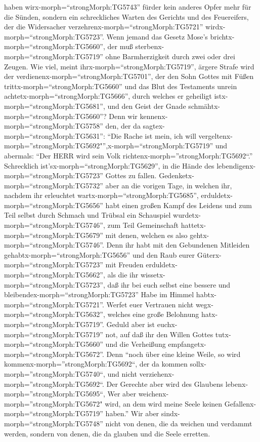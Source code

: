 haben wirx-morph=``strongMorph:TG5743'' fürder kein anderes Opfer mehr
für die Sünden,  sondern ein schreckliches Warten des
Gerichts und des Feuereifers, der die Widersacher
verzehrenx-morph=``strongMorph:TG5721''
wirdx-morph=``strongMorph:TG5723''.  Wenn jemand das Gesetz
Mose's brichtx-morph=``strongMorph:TG5660'', der muß
sterbenx-morph=``strongMorph:TG5719'' ohne Barmherzigkeit durch zwei
oder drei Zeugen.  Wie viel, meint
ihrx-morph=``strongMorph:TG5719'', ärgere Strafe wird der
verdienenx-morph=``strongMorph:TG5701'', der den Sohn Gottes mit Füßen
trittx-morph=``strongMorph:TG5660'' und das Blut des Testaments unrein
achtetx-morph=``strongMorph:TG5666'', durch welches er geheiligt
istx-morph=``strongMorph:TG5681'', und den Geist der Gnade
schmähtx-morph=``strongMorph:TG5660''?  Denn wir
kennenx-morph=``strongMorph:TG5758'' den, der da
sagtex-morph=``strongMorph:TG5631'': ``Die Rache ist mein, ich will
vergeltenx-morph=''strongMorph:TG5692"'',x-morph=``strongMorph:TG5719''
und abermals: ``Der HERR wird sein Volk
richtenx-morph=''strongMorph:TG5692``.''  Schrecklich
ist'sx-morph=``strongMorph:TG5629'', in die Hände des
lebendigenx-morph=``strongMorph:TG5723'' Gottes zu fallen. 
Gedenketx-morph=``strongMorph:TG5732'' aber an die vorigen Tage, in
welchen ihr, nachdem ihr erleuchtet wartx-morph=``strongMorph:TG5685'',
erduldetx-morph=``strongMorph:TG5656'' habt einen großen Kampf des
Leidens  und zum Teil selbst durch Schmach und Trübsal ein
Schauspiel wurdetx-morph=``strongMorph:TG5746'', zum Teil Gemeinschaft
hattetx-morph=``strongMorph:TG5679'' mit denen, welchen es also
gehtx-morph=``strongMorph:TG5746''.  Denn ihr habt mit den
Gebundenen Mitleiden gehabtx-morph=``strongMorph:TG5656'' und den Raub
eurer Güterx-morph=``strongMorph:TG5723'' mit Freuden
erduldetx-morph=``strongMorph:TG5662'', als die ihr
wissetx-morph=``strongMorph:TG5723'', daß ihr bei euch selbst eine
bessere und bleibendex-morph=``strongMorph:TG5723'' Habe im Himmel
habtx-morph=``strongMorph:TG5721''.  Werfet euer Vertrauen
nicht wegx-morph=``strongMorph:TG5632'', welches eine große Belohnung
hatx-morph=``strongMorph:TG5719''.  Geduld aber ist
euchx-morph=``strongMorph:TG5719'' not, auf daß ihr den Willen Gottes
tutx-morph=``strongMorph:TG5660'' und die Verheißung
empfangetx-morph=``strongMorph:TG5672''.  Denn ``noch über
eine kleine Weile, so wird kommenx-morph=''strongMorph:TG5692``, der da
kommen sollx-morph=''strongMorph:TG5740``, und nicht
verziehenx-morph=''strongMorph:TG5692``.  Der Gerechte aber
wird des Glaubens lebenx-morph=''strongMorph:TG5695``, Wer aber
weichenx-morph=''strongMorph:TG5672" wird, an dem wird meine Seele
keinen Gefallenx-morph=``strongMorph:TG5719'' haben.''  Wir
aber sindx-morph=``strongMorph:TG5748'' nicht von denen, die da weichen
und verdammt werden, sondern von denen, die da glauben und die Seele
erretten.

